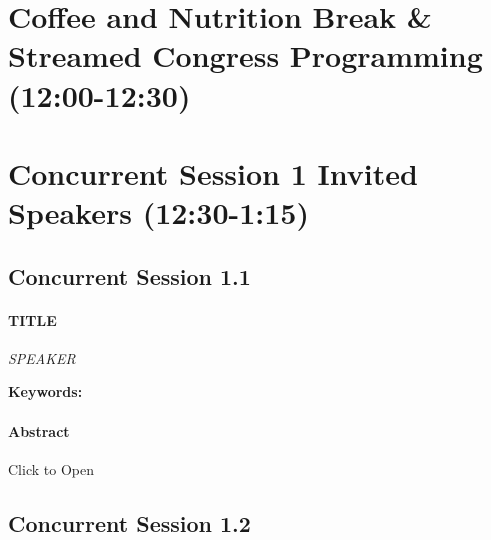 \documentclass[
]{book}
\begin{document}
\hypertarget{coffee-and-nutrition-break-streamed-congress-programming-1200-1230}{%
\section*{Coffee and Nutrition Break \& Streamed Congress Programming (12:00-12:30)}\label{coffee-and-nutrition-break-streamed-congress-programming-1200-1230}}

\hypertarget{concurrent-session-1-invited-speakers-1230-115}{%
\section*{Concurrent Session 1 \textbar{} Invited Speakers (12:30-1:15)}\label{concurrent-session-1-invited-speakers-1230-115}}

\hypertarget{concurrent-session-1.1}{%
\subsection*{Concurrent Session 1.1}\label{concurrent-session-1.1}}

\begin{speaker}
\hypertarget{title}{%
\paragraph{\texorpdfstring{\textbf{TITLE}}{TITLE}}\label{title}}

\emph{SPEAKER}

\textbf{Keywords:}

\hypertarget{abstract}{%
\paragraph{Abstract}\label{abstract}}

Click to Open
\end{speaker}

\hypertarget{concurrent-session-1.2}{%
\subsection*{Concurrent Session 1.2}\label{concurrent-session-1.2}}
\end{document}
